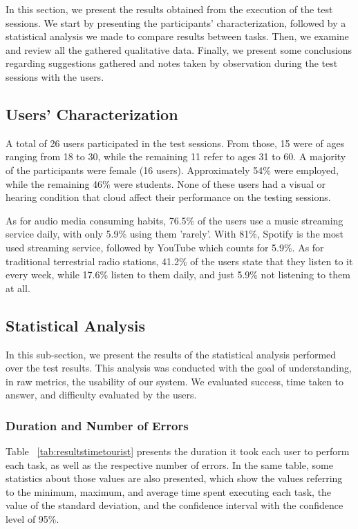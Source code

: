 In this section, we present the results obtained from the execution of the test sessions. We start by presenting the participants’ characterization, followed by a statistical analysis we made to compare results between tasks. Then, we examine and review all the gathered qualitative data. Finally, we present some conclusions regarding suggestions gathered and notes taken by observation during the test sessions with the users.

\subsection{Users’ Characterization}

A total of 26 users participated in the test sessions. From those, 15 were of ages ranging from 18 to 30, while the remaining 11 refer to ages 31 to 60. A majority of the participants were female (16 users). Approximately 54\% were employed, while the remaining 46\% were students. None of these users had a visual or hearing condition that cloud affect their performance on the testing sessions.

As for audio media consuming habits, 76.5\% of the users use a music streaming service daily, with only 5.9\% using them 'rarely'. With 81\%, Spotify is the most used streaming service, followed by YouTube which counts for 5.9\%. As for traditional terrestrial radio stations, 41.2\% of the users state that they listen to it every week, while 17.6\% listen to them daily, and just 5.9\% not listening to them at all.

\subsection{Statistical Analysis}

In this sub-section, we present the results of the statistical analysis performed over the test results. This analysis was conducted with the goal of understanding, in raw metrics, the usability of our system. We evaluated success, time taken to answer, and difficulty evaluated by the users.

\subsubsection{Duration and Number of Errors}

Table ~\ref{tab:resultstimetourist} presents the duration it took each user to perform each task, as well as the respective number of errors. In the same table, some statistics about those values are also presented, which show the values referring to the minimum, maximum, and average time spent executing each task, the value of the standard deviation, and the confidence interval with the confidence level of 95\%.

